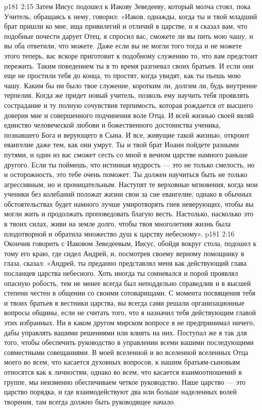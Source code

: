 \vs p181 2:15 \pc Затем Иисус подошел к Иакову Зеведееву, который молча стоял, пока Учитель, обращаясь к нему, говорил: «Иаков, однажды, когда ты и твой младший брат пришли ко мне, ища привилегий и отличий в царстве, и я сказал вам, что подобные почести дарует Отец, я спросил вас, сможете ли вы пить мою чашу, и вы оба ответили, что можете. Даже если вы не могли того тогда и не можете этого теперь, вас вскоре приготовит к подобному служению то, что вам предстоит пережить. Таким поведением ты в то время разгневал своих братьев. И если они еще не простили тебя до конца, то простят, когда увидят, как ты пьешь мою чашу. Каким бы ни было твое служение, коротким ли, долгим ли, будь внутренне терпелив. Когда же придет новый учитель, позволь ему научить тебя проявлять сострадание и ту полную сочувствия терпимость, которая рождается от высшего доверия мне и совершенного подчинения воле Отца. И всей жизнью своей являй единство человеческой любови и божественного достоинства ученика, познавшего Бога и верующего в Сына. И все, живущие такой жизнью, откроют евангелие даже тем, как они умрут. Ты и твой брат Иоанн пойдете разными путями, и один из вас сможет сесть со мной в вечном царстве намного раньше другого. Если ты поймешь, что истинная мудрость --- это не только смелость, но и осторожность, это тебе очень поможет. Ты должен научиться быть не только агрессивным, но и проницательным. Наступят те верховные мгновения, когда мои ученики без колебаний положат жизни свои за сие евангелие, однако в обычных обстоятельствах будет намного лучше умиротворять гнев неверующих, чтобы вы могли жить и продолжать проповедовать благую весть. Настолько, насколько это в твоих силах, живи на земле долго, чтобы твоя многолетняя жизнь была плодотворной и обратила множество душ к царству небесному».
\vs p181 2:16 \pc Окончив говорить с Иаковом Зеведеевым, Иисус, обойдя вокруг стола, подошел к тому его краю, где сидел Андрей, и, посмотрев своему верному помощнику в глаза, сказал: «Андрей, ты преданно представлял меня как действующий глава посланцев царства небесного. Хоть иногда ты сомневался и порой проявлял опасную робость, тем не менее всегда был неподдельно справедлив и в высшей степени честен в общении со своими сотоварищами. С момента посвящения тебя и твоих братьев в вестники царства, вы всегда сами решали организационные вопросы общины, если не считать того, что я назначил тебя действующим главой этих избранных. Ни в каком другом мирском вопросе я не предпринимал ничего, дабы управлять вашими решениями или влиять на них. Поступал же я так для того, чтобы обеспечить руководство в управлении всеми вашими последующими совместными совещаниями. В моей вселенной и во вселенной вселенных Отца моего во всем, что касается духовных вопросов, к нашим братьям\hyp{}сыновьям относятся как к личностям, однако во всем, что касается взаимоотношений в группе, мы неизменно обеспечиваем четкое руководство. Наше царство --- это царство порядка, и где взаимодействуют два или больше наделенных волей творения, там всегда должно быть руководящее начало.
